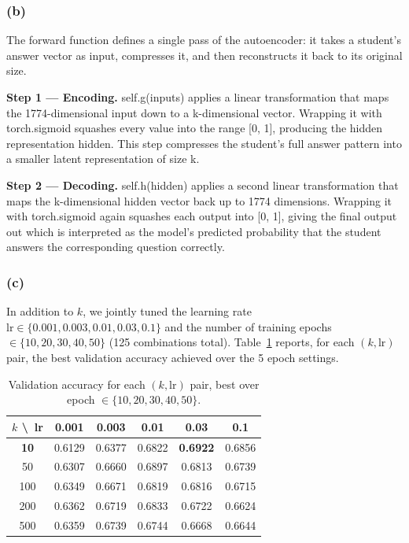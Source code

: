 \documentclass[11pt, letterpaper]{article}
\begin{document}
\subsubsection*{(b)}

The forward function defines a single pass of the autoencoder: it takes a student's answer vector as input, compresses it, and then reconstructs it back to its original size.

\textbf{Step 1 — Encoding.} self.g(inputs) applies a linear transformation that maps the 1774-dimensional input down to a k-dimensional vector. Wrapping it with torch.sigmoid squashes every value into the range [0, 1], producing the hidden representation hidden. This step compresses the student's full answer pattern into a smaller latent representation of size k.

\textbf{Step 2 — Decoding.} self.h(hidden) applies a second linear transformation that maps the k-dimensional hidden vector back up to 1774 dimensions. Wrapping it with torch.sigmoid again squashes each output into [0, 1], giving the final output out which is interpreted as the model's predicted probability that the student answers the corresponding question correctly. 

\subsubsection*{(c)}

In addition to $k$, we jointly tuned the learning rate $\text{lr} \in \{0.001, 0.003, 0.01, 0.03, 0.1\}$ and the number of training epochs $\in \{10, 20, 30, 40, 50\}$ (125 combinations total). Table~\ref{tab:nn-k-lr} reports, for each $(k, \text{lr})$ pair, the best validation accuracy achieved over the 5 epoch settings.

\begin{table}[H]
\centering
\caption{Validation accuracy for each $(k, \text{lr})$ pair, best over epoch $\in \{10,20,30,40,50\}$.}
\label{tab:nn-k-lr}
\begin{tabular}{c|ccccc}
\toprule
$k$ \textbackslash\ lr & 0.001 & 0.003 & 0.01 & \textbf{0.03} & 0.1 \\
\midrule
\textbf{10} & 0.6129 & 0.6377 & 0.6822 & \textbf{0.6922} & 0.6856 \\
50 & 0.6307 & 0.6660 & 0.6897 & 0.6813 & 0.6739 \\
100 & 0.6349 & 0.6671 & 0.6819 & 0.6816 & 0.6715 \\
200 & 0.6362 & 0.6719 & 0.6833 & 0.6722 & 0.6624 \\
500 & 0.6359 & 0.6739 & 0.6744 & 0.6668 & 0.6644 \\
\bottomrule
\end{tabular}
\end{table}
\end{document}
